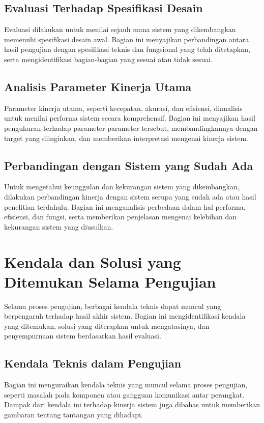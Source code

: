 \subsection{Evaluasi Terhadap Spesifikasi Desain}
Evaluasi dilakukan untuk menilai sejauh mana sistem yang dikembangkan memenuhi spesifikasi desain awal. Bagian ini menyajikan perbandingan antara hasil pengujian dengan spesifikasi teknis dan fungsional yang telah ditetapkan, serta mengidentifikasi bagian-bagian yang sesuai atau tidak sesuai.

\subsection{Analisis Parameter Kinerja Utama}
Parameter kinerja utama, seperti kecepatan, akurasi, dan efisiensi, dianalisis untuk menilai performa sistem secara komprehensif. Bagian ini menyajikan hasil pengukuran terhadap parameter-parameter tersebut, membandingkannya dengan target yang diinginkan, dan memberikan interpretasi mengenai kinerja sistem.

\subsection{Perbandingan dengan Sistem yang Sudah Ada}
Untuk mengetahui keunggulan dan kekurangan sistem yang dikembangkan, dilakukan perbandingan kinerja dengan sistem serupa yang sudah ada atau hasil penelitian terdahulu. Bagian ini menganalisis perbedaan dalam hal performa, efisiensi, dan fungsi, serta memberikan penjelasan mengenai kelebihan dan kekurangan sistem yang diusulkan.

\section{Kendala dan Solusi yang Ditemukan Selama Pengujian}
Selama proses pengujian, berbagai kendala teknis dapat muncul yang berpengaruh terhadap hasil akhir sistem. Bagian ini mengidentifikasi kendala yang ditemukan, solusi yang diterapkan untuk mengatasinya, dan penyempurnaan sistem berdasarkan hasil evaluasi.

\subsection{Kendala Teknis dalam Pengujian}
Bagian ini menguraikan kendala teknis yang muncul selama proses pengujian, seperti masalah pada komponen atau gangguan komunikasi antar perangkat. Dampak dari kendala ini terhadap kinerja sistem juga dibahas untuk memberikan gambaran tentang tantangan yang dihadapi.

